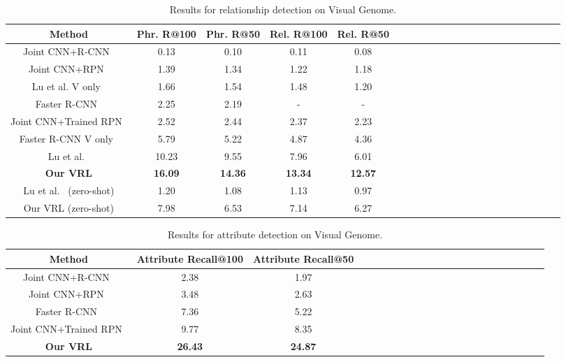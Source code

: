 \documentclass[10pt,twocolumn,letterpaper]{article}
\begin{document}
\begin{table}[!tp]\setlength{\tabcolsep}{2pt}
	\centering\scriptsize
	\caption{Results for relationship detection on Visual Genome. }\label{tab:VG_rel}
	\begin{tabular}{c|c|c|c|cccccccccccccccccc}
		\toprule
		{Method} &   Phr. R@100 & Phr. R@50  &  Rel. R@100 & Rel. R@50  \\

		\midrule
		{Joint CNN+R-CNN~\cite{simonyan2014very}} & {0.13} & 0.10 & 0.11 & 0.08  \\
		\midrule
		Joint CNN+RPN~\cite{simonyan2014very} & {1.39} & 1.34 & 1.22 & 1.18  \\	
		\midrule
		Lu et al. V only~\cite{lu2016visual} & {1.66} & {1.54} & {1.48} & {1.20}  \\
			
		\midrule
		Faster R-CNN~\cite{ren2015faster} & {2.25} & 2.19 & - & -  \\		
		\midrule
		Joint CNN+Trained RPN~\cite{ren2015faster} & {2.52} & 2.44 & 2.37 & 2.23  \\
	
		\midrule
		Faster R-CNN V only~\cite{ren2015faster} & {5.79} & {5.22} & {4.87} & {4.36}  \\
		\midrule
		Lu et al.~\cite{lu2016visual} & {10.23} & {9.55} & {7.96} & {6.01}  \\
		
		\midrule
		\textbf{Our VRL} & \textbf{16.09} & \textbf{14.36} & \textbf{13.34} & \textbf{12.57}  \\
		\hline
		\midrule
		Lu et al.~\cite{lu2016visual} (zero-shot) & {1.20} & 1.08 & 1.13 & 0.97  \\
		\midrule
		{Our VRL} (zero-shot) & {7.98} & {6.53} & {7.14} & {6.27}  \\
		\bottomrule
	\end{tabular}\vspace{-6mm}
\end{table}


\begin{table}[!tp]\setlength{\tabcolsep}{2pt}
	\centering\scriptsize
	\caption{Results for attribute detection on Visual Genome. }\label{tab:vg_attr}
	\begin{tabular}{c|c|cccccccccccccccccccc}
		\toprule
		{Method} &  Attribute Recall@100 & Attribute Recall@50  \\
		\midrule
		{Joint CNN+R-CNN~\cite{simonyan2014very}} & {2.38} & 1.97   \\
		\midrule
		Joint CNN+RPN~\cite{simonyan2014very} & {3.48} & 2.63 \\
		\midrule
		Faster R-CNN~\cite{ren2015faster} & {7.36} & 5.22 \\
		\midrule
		Joint CNN+Trained RPN~\cite{ren2015faster} & {9.77} & 8.35 \\
		
		\midrule
		\textbf{Our VRL} & \textbf{26.43} & \textbf{24.87} \\
		\bottomrule
	\end{tabular}\vspace{-6mm}
\end{table}
\end{document}
